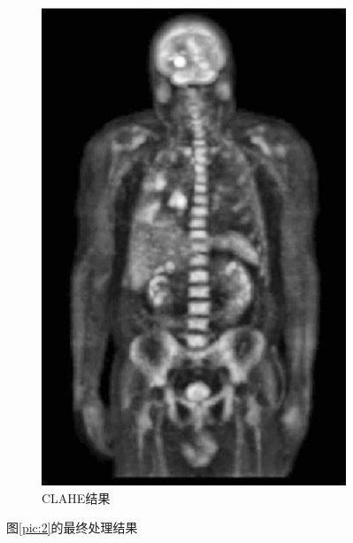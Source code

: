\documentclass[a4paper]{ctexart}
\newcommand{\outwthree}{0.3\textwidth}
\begin{document}
\begin{spacing}{1.35}
\begin{figure}[htbp]
\begin{subfigure}[t]{\outwthree}
			\includegraphics[width=\textwidth]{figure/2_tile_grid_size_16.png}
			\caption{CLAHE结果}
		\end{subfigure}
		\caption{图\ref{pic:2}的最终处理结果}
		\label{fig:2homoCLAHE_3}
	\end{figure}


\end{spacing}
\end{document}
